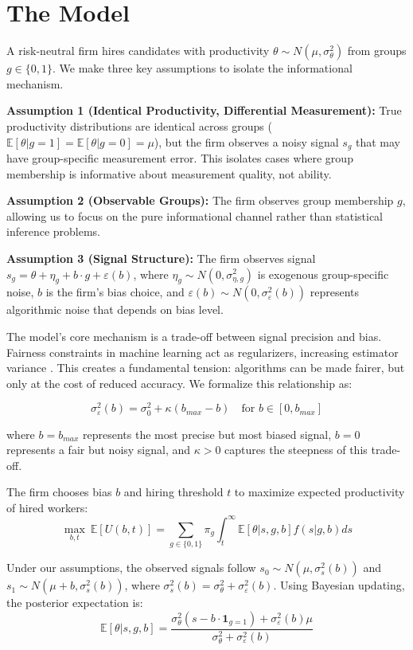 \section{The Model}

A risk-neutral firm hires candidates with productivity $\theta \sim N(\mu, \sigma_\theta^2)$ from groups $g \in \{0, 1\}$. We make three key assumptions to isolate the informational mechanism.

\textbf{Assumption 1 (Identical Productivity, Differential Measurement):} True productivity distributions are identical across groups ($\mathbb{E}[\theta|g=1] = \mathbb{E}[\theta|g=0] = \mu$), but the firm observes a noisy signal $s_g$ that may have group-specific measurement error. This isolates cases where group membership is informative about measurement quality, not ability.

\textbf{Assumption 2 (Observable Groups):} The firm observes group membership $g$, allowing us to focus on the pure informational channel rather than statistical inference problems.

\textbf{Assumption 3 (Signal Structure):} The firm observes signal $s_g = \theta + \eta_g + b \cdot g + \varepsilon(b)$, where $\eta_g \sim N(0, \sigma_{\eta,g}^2)$ is exogenous group-specific noise, $b$ is the firm's bias choice, and $\varepsilon(b) \sim N(0, \sigma_\varepsilon^2(b))$ represents algorithmic noise that depends on bias level.

The model's core mechanism is a trade-off between signal precision and bias. Fairness constraints in machine learning act as regularizers, increasing estimator variance \citep{Kamishima2012, Wick2019}. This creates a fundamental tension: algorithms can be made fairer, but only at the cost of reduced accuracy. We formalize this relationship as:

\begin{equation}
\sigma_\varepsilon^2(b) = \sigma_0^2 + \kappa(b_{max} - b) \quad \text{for } b \in [0, b_{max}]
\end{equation}

where $b=b_{max}$ represents the most precise but most biased signal, $b=0$ represents a fair but noisy signal, and $\kappa > 0$ captures the steepness of this trade-off.

The firm chooses bias $b$ and hiring threshold $t$ to maximize expected productivity of hired workers:
\begin{equation}
\max_{b, t} \ \mathbb{E}[U(b,t)] = \sum_{g \in \{0,1\}} \pi_g \int_t^\infty \mathbb{E}[\theta | s, g, b] f(s|g, b) ds
\end{equation}

Under our assumptions, the observed signals follow $s_0 \sim N(\mu, \sigma_s^2(b))$ and $s_1 \sim N(\mu + b, \sigma_s^2(b))$, where $\sigma_s^2(b) = \sigma_\theta^2 + \sigma_\varepsilon^2(b)$. Using Bayesian updating, the posterior expectation is:
\begin{equation}
\mathbb{E}[\theta | s, g, b] = \frac{\sigma_\theta^2 (s - b \cdot \mathbf{1}_{g=1}) + \sigma_\varepsilon^2(b) \mu}{\sigma_\theta^2 + \sigma_\varepsilon^2(b)}
\end{equation}